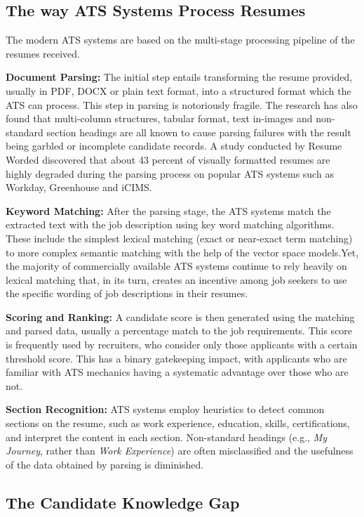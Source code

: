 \documentclass[12pt, a4paper, oneside]{report}
\begin{document}
\subsection{The way ATS Systems Process Resumes}

The modern ATS systems are based on the multi-stage processing pipeline of the resumes received.

\textbf{Document Parsing:} The initial step entails transforming the resume provided, usually in PDF, DOCX or plain text format, into a structured format which the ATS can process. This step in parsing is notoriously fragile. The research has also found that multi-column structures, tabular format, text in-images and non-standard section headings are all known to cause parsing failures with the result being garbled or incomplete candidate records\cite{resumeworded2022}. A study conducted by Resume Worded discovered that about 43 percent of visually formatted resumes are highly degraded during the parsing process on popular ATS systems such as Workday, Greenhouse and iCIMS.

\textbf{Keyword Matching:} After the parsing stage, the ATS systems match the extracted text with the job description using key word matching algorithms. These include the simplest lexical matching (exact or near-exact term matching) to more complex semantic matching with the help of the vector space models\cite{qin2018}.Yet, the majority of commercially available ATS systems continue to rely heavily on lexical matching that, in its turn, creates an incentive among job seekers to use the specific wording of job descriptions in their resumes.

\textbf{Scoring and Ranking:} A candidate score is then generated using the matching and parsed data, usually a percentage match to the job requirements. This score is frequently used by recruiters, who consider only those applicants with a certain threshold score. This has a binary gatekeeping impact, with applicants who are familiar with ATS mechanics having a systematic advantage over those who are not\cite{jobscan2021}.

\textbf{Section Recognition:} ATS systems employ heuristics to detect common sections on the resume, such as work experience, education, skills, certifications, and interpret the content in each section. Non-standard headings (e.g., \textit{My Journey}, rather than \textit{Work Experience}) are often misclassified and the usefulness of the data obtained by parsing is diminished.

\subsection{The Candidate Knowledge Gap}
\end{document}
